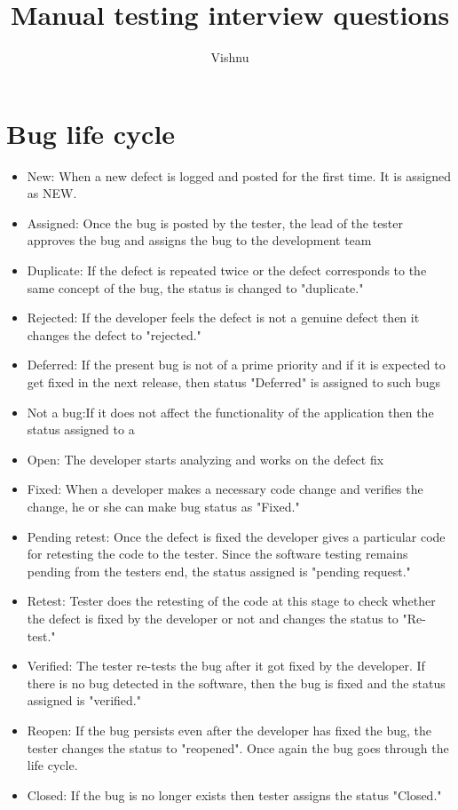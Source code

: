 \documentclass[12pt, oneside]{article}
\title{Manual testing interview questions}
\begin{document}
\author{Vishnu}
\maketitle
\section{Bug life cycle}
\begin{itemize}

\item New: When a new defect is logged and posted for the first time. 
    It is assigned as NEW.
\item Assigned: Once the bug is posted by the tester, 
    the lead of the tester approves the bug and assigns the 
    bug to the development team
\item Duplicate: If the defect is repeated twice or the defect 
    corresponds to the same concept of the bug, 
    the status is changed to "duplicate."
\item Rejected: If the developer feels the defect is not a genuine defect then it changes the defect to "rejected."
\item Deferred: If the present bug is not of a prime priority and if it is expected to get fixed in the next release, then status "Deferred" is assigned to such bugs
\item Not a bug:If it does not affect the functionality of the application then the status assigned to a 
\item Open: The developer starts analyzing and works on the defect fix
\item Fixed: When a developer makes a necessary code change and verifies the change, he or she can make bug status as "Fixed."
\item Pending retest: Once the defect is fixed the developer gives a particular code for retesting the code to the tester. Since the software testing remains pending from the testers end, the status assigned is "pending request."
\item Retest: Tester does the retesting of the code at this stage to check whether the defect is fixed by the developer or not and changes the status to "Re-test."
\item Verified: The tester re-tests the bug after it got fixed by the developer. If there is no bug detected in the software, then the bug is fixed and the status assigned is "verified."
\item Reopen: If the bug persists even after the developer has fixed the bug, the tester changes the status to "reopened". Once again the bug goes through the life cycle.
\item Closed: If the bug is no longer exists then tester assigns the status "Closed." 
\end{itemize}
\end{document}
